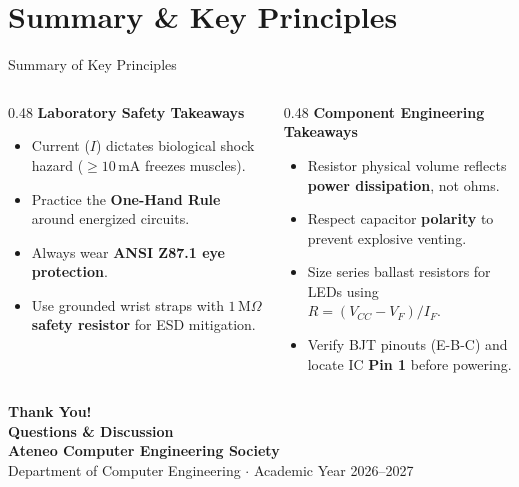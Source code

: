 
\section{Summary \& Key Principles}

\begin{frame}{Summary of Key Principles}
    \begin{columns}[T]
        \begin{column}{0.48\textwidth}
            \textbf{Laboratory Safety Takeaways}
            \begin{itemize}
                \item Current ($I$) dictates biological shock hazard ($\ge 10\,\text{mA}$ freezes muscles).
                \item Practice the \textbf{One-Hand Rule} around energized circuits.
                \item Always wear \textbf{ANSI Z87.1 eye protection}.
                \item Use grounded wrist straps with \textbf{$1\,\text{M}\Omega$ safety resistor} for ESD mitigation.
            \end{itemize}
        \end{column}
        \begin{column}{0.48\textwidth}
            \textbf{Component Engineering Takeaways}
            \begin{itemize}
                \item Resistor physical volume reflects \textbf{power dissipation}, not ohms.
                \item Respect capacitor \textbf{polarity} to prevent explosive venting.
                \item Size series ballast resistors for LEDs using $R = (V_{CC} - V_F)/I_F$.
                \item Verify BJT pinouts (E-B-C) and locate IC \textbf{Pin 1} before powering.
            \end{itemize}
        \end{column}
    \end{columns}
\end{frame}

\begin{frame}[plain]
    \centering
    \vspace{2cm}
    {\Huge \textbf{Thank You!}}\\[1em]
    {\large \textbf{Questions \& Discussion}}\\[0.8em]
    \textbf{Ateneo Computer Engineering Society}\\[0.3em]
    \footnotesize Department of Computer Engineering $\cdot$ Academic Year 2026--2027
\end{frame}
